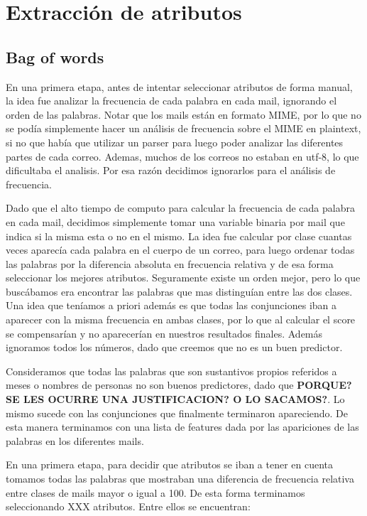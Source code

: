 \documentclass[10pt,a4paper]{article}
\begin{document}
\section{Extracción de atributos}

\subsection{Bag of words}

En una primera etapa, antes de intentar seleccionar atributos de forma manual, la idea fue analizar la frecuencia de cada palabra en cada mail, ignorando el orden de las palabras. Notar que los mails están en formato MIME, por lo que no se podía simplemente hacer un análisis de frecuencia sobre el MIME en plaintext, si no que había que utilizar un parser para luego poder analizar las diferentes partes de cada correo. Ademas, muchos de los correos no estaban en utf-8, lo que dificultaba el analisis. Por esa razón decidimos ignorarlos para el análisis de frecuencia.

Dado que el alto tiempo de computo para calcular la frecuencia de cada palabra en cada mail, decidimos simplemente tomar una variable binaria por mail que indica si la misma esta o no en el mismo. La idea fue calcular por clase cuantas veces aparecía cada palabra en el cuerpo de un correo, para luego ordenar todas las palabras por la diferencia absoluta en frecuencia relativa y de esa forma seleccionar los mejores atributos. Seguramente existe un orden mejor, pero lo que buscábamos era encontrar las palabras que mas distinguían entre las dos clases. Una idea que teníamos a priori además es que todas las conjunciones iban a aparecer con la misma frecuencia en ambas clases, por lo que al calcular el score se compensarían y no aparecerían en nuestros resultados finales. Además ignoramos todos los números, dado que creemos que no es un buen predictor.

Consideramos que todas las palabras que son sustantivos propios referidos a meses o nombres de personas no son buenos predictores, dado que  \textbf{PORQUE? SE LES OCURRE UNA JUSTIFICACION? O LO SACAMOS?}. Lo mismo sucede con las conjunciones que finalmente terminaron apareciendo. De esta manera terminamos con una lista de features dada por las apariciones de las palabras en los diferentes mails.

En una primera etapa, para decidir que atributos se iban a tener en cuenta tomamos todas las palabras que mostraban una diferencia de frecuencia relativa entre clases de mails mayor o igual a 100. De esta forma terminamos seleccionando XXX atributos. Entre ellos se encuentran:
\end{document}
